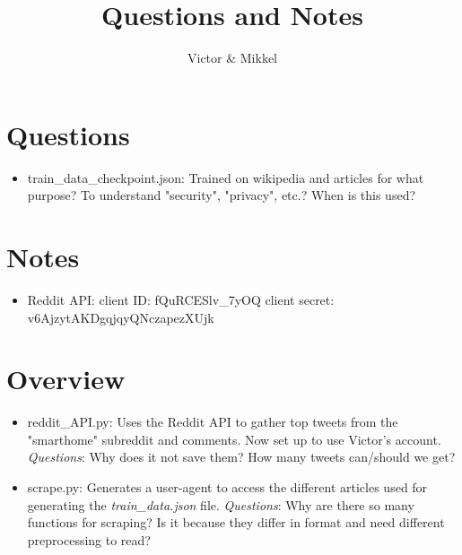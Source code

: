 \documentclass{article}
\begin{document}
\title{Questions and Notes}
\author{Victor \& Mikkel}

\maketitle

\section{Questions}
\begin{itemize}
	\item train\_data\_checkpoint.json:
	Trained on wikipedia and articles for what purpose?
	To understand "security", "privacy", etc.?
	When is this used?

\end{itemize}

\section{Notes}
\begin{itemize}
	\item Reddit API:
	client ID: fQuRCESlv\_7yOQ
	client secret: v6AjzytAKDgqjqyQNczapezXUjk
\end{itemize}

\section{Overview}
\begin{itemize}
	\item reddit\_API.py:
	Uses the Reddit API to gather top tweets
	from the "smarthome" subreddit and comments.
	Now set up to use Victor's account.
	\emph{Questions}: Why does it not save them?
	How many tweets can/should we get?
	\item scrape.py:
	Generates a user-agent to access the different 
	articles used for generating the \textit{train\_data.json} file.
	\emph{Questions}: Why are there so many functions for scraping? 
	Is it because they differ in format and need different preprocessing to read?
\end{itemize}
\end{document}
